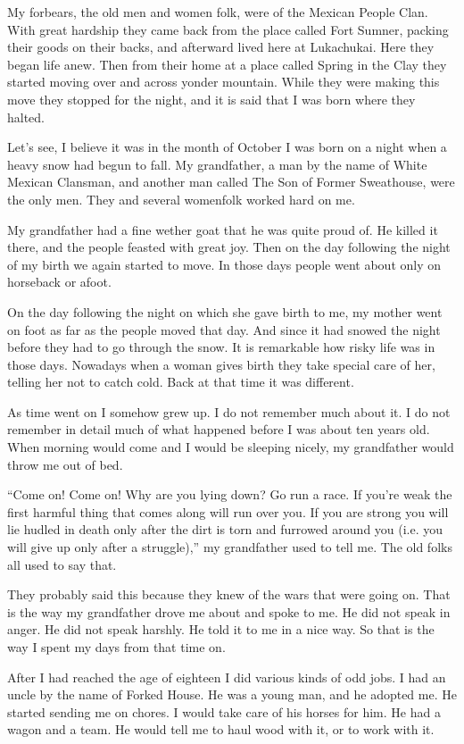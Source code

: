 My forbears, the old men and women folk, were of the Mexican People Clan. With great hardship they came back from the place called Fort Sumner, packing their goods on their backs, and afterward lived here at Lukachukai. Here they began life anew. Then from their home at a place called Spring in the Clay they started moving over and across yonder mountain. While they were making this move they stopped for the night, and it is said that I was born where they halted.

Let's see, I believe it was in the month of October I was born on a night when a heavy snow had begun to fall. My grandfather, a man by the name of White Mexican Clansman, and another man called The Son of Former Sweathouse, were the only men. They and several womenfolk worked hard on me.

My grandfather had a fine wether goat that he was quite proud of. He killed it there, and the people feasted with great joy. Then on the day following the night of my birth we again started to move. In those days people went about only on horseback or afoot.

On the day following the night on which she gave birth to me, my mother went on foot as far as the people moved that day. And since it had snowed the night before they had to go through the snow. It is remarkable how risky life was in those days. Nowadays when a woman gives birth they take special care of her, telling her not to catch cold. Back at that time it was different.

As time went on I somehow grew up. I do not remember much about it. I do not remember in detail much of what happened before I was about ten years old. When morning would come and I would be sleeping nicely, my grandfather would throw me out of bed.

``Come on! Come on! Why are you lying down? Go run a race. If you're weak the first harmful thing that comes along will run over you. If you are strong you will lie hudled in death only after the dirt is torn and furrowed around you (i.e. you will give up only after a struggle),'' my grandfather used to tell me. The old folks all used to say that.

They probably said this because they knew of the wars that were going on. That is the way my grandfather drove me about and spoke to me. He did not speak in anger. He did not speak harshly. He told it to me in a nice way. So that is the way I spent my days from that time on.

After I had reached the age of eighteen I did various kinds of odd jobs. I had an uncle by the name of Forked House. He was a young man, and he adopted me. He started sending me on chores. I would take care of his horses for him. He had a wagon and a team. He would tell me to haul wood with it, or to work with it.

